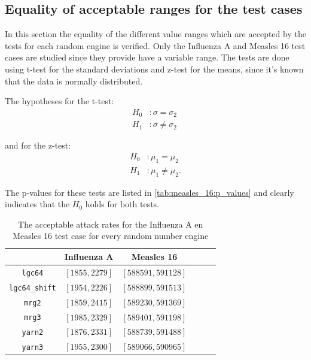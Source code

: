 \documentclass{acmart}
\begin{document}
\subsection{Equality of acceptable ranges for the test cases}

In this section the equality of the different value ranges which are accepted by the tests for each random engine is verified. Only the Influenza A and Measles 16 test cases are studied since they provide have a variable range. The tests are done using t-test for the standard deviations and z-test for the means, since it's known that the data is normally distributed.

The hypotheses for the t-test:
\[
\begin{aligned}
 H_0 &: \sigma = \sigma_2\\
 H_1 &: \sigma \ne \sigma_2\
\end{aligned}
\]

and for the z-test:
\[
\begin{aligned}
 H_0 &: \mu_1 = \mu_2  \\
 H_1 &: \mu_1 \ne \mu_2.
\end{aligned}
\]

The p-values for these tests are listed in \cref{tab:measles_16:p_values} and clearly indicates that the \(H_0\) holds for both tests. %


\begin{table}[!hbt]
    \centering
    \bgroup
    \def\arraystretch{2}
    \begin{tabular}{c|c|c|c|c|c}
                                & \textbf{Influenza A}  & \textbf{Measles 16} \\ \hline
        \texttt{lgc64}          & \([1855,2279]\)       & \([588591,591128]\) \\
        \texttt{lgc64\_shift}   & \([1954,2226]\)       & \([588899,591513]\) \\
        \texttt{mrg2}           & \([1859,2415]\)       & \([589230,591369]\) \\
        \texttt{mrg3}           & \([1985,2329]\)       & \([589401,591198]\) \\
        \texttt{yarn2}          & \([1876,2331]\)       & \([588739,591488]\) \\
        \texttt{yarn3}          & \([1955,2300]\)       & \([589066,590965]\) \\
    \end{tabular}
    \egroup
    \caption{The acceptable attack rates for the Influenza A en Measles 16 test case for every random number engine}
    \label{tab:ranges_engines}
\end{table}
\end{document}

